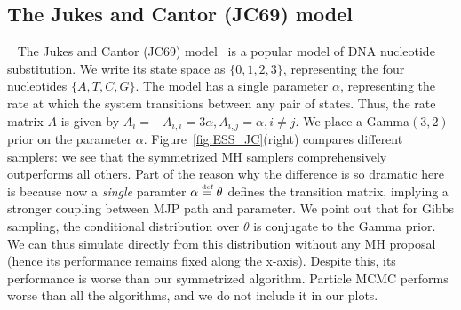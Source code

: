   \subsection{The Jukes and Cantor (JC69) model}~
  The Jukes and Cantor (JC69) model~\citep{jukescantor69} is a popular model of DNA nucleotide substitution.  
  We write its state space as $\{0, 1, 2, 3\}$, representing the four nucleotides $\{A, T, C, G\}$.  
  The model has a single parameter $\alpha$, representing the rate at which the system transitions between any pair of states. 
  Thus, the rate matrix $A$ is given by $A_i = -A_{i,i} = 3\alpha, A_{i, j} = \alpha,i \neq j.$
We place a Gamma$(3,2)$ prior on the parameter $\alpha$.
Figure~\ref{fig:ESS_JC}(right) compares different samplers: we see that the symmetrized MH samplers comprehensively outperforms all others.
Part of the reason why the difference is so dramatic here is because now a {\em single} paramter $\alpha \defeq \theta$ defines the transition matrix, implying a stronger coupling between MJP path and parameter. 
We point out that for Gibbs sampling, the conditional distribution over $\theta$ is conjugate to the Gamma prior. We can thus simulate directly from this distribution without any MH proposal (hence its performance remains fixed along the x-axis). 
Despite this, its performance is worse than our symmetrized algorithm.
Particle MCMC performs worse than all the algorithms, and we do not include it in our plots.

